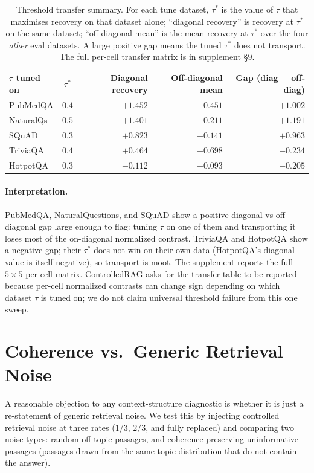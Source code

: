 \begin{table}[!htb]
\centering
\caption{Threshold transfer summary. For each tune dataset, $\tau^\ast$
is the value of $\tau$ that maximises recovery on that dataset alone;
``diagonal recovery'' is recovery at $\tau^\ast$ on the same dataset;
``off-diagonal mean'' is the mean recovery at $\tau^\ast$ over the four
\emph{other} eval datasets. A large positive gap means the tuned
$\tau^\ast$ does not transport. The full per-cell transfer matrix is
in supplement \S 9.}
\label{tab:threshold_transfer_main}
\footnotesize
\begin{tabular}{lcrrr}
\toprule
$\tau$ tuned on & $\tau^\ast$ & Diagonal recovery & Off-diagonal mean & Gap (diag $-$ off-diag) \\
\midrule
PubMedQA  & $0.4$ & $+1.452$ & $+0.451$ & $+1.002$ \\
NaturalQs & $0.5$ & $+1.401$ & $+0.211$ & $+1.191$ \\
SQuAD     & $0.3$ & $+0.823$ & $-0.141$ & $+0.963$ \\
TriviaQA  & $0.4$ & $+0.464$ & $+0.698$ & $-0.234$ \\
HotpotQA  & $0.3$ & $-0.112$ & $+0.093$ & $-0.205$ \\
\bottomrule
\end{tabular}
\end{table}

\paragraph{Interpretation.} PubMedQA, NaturalQuestions, and SQuAD show
a positive diagonal-vs-off-diagonal gap large enough to flag: tuning
$\tau$ on one of them and transporting it loses most of the
on-diagonal normalized contrast. TriviaQA and HotpotQA show a negative
gap; their $\tau^\ast$ does not win on their own data (HotpotQA's
diagonal value is itself negative), so transport is moot. The
supplement reports the full $5 \times 5$ per-cell matrix. ControlledRAG
asks for the transfer table to be reported because per-cell normalized
contrasts can change sign depending on which dataset $\tau$ is tuned
on; we do not claim universal threshold failure from this one sweep.

\section{Coherence vs.\ Generic Retrieval Noise}
\label{sec:noise}

A reasonable objection to any context-structure diagnostic is whether it
is just a re-statement of generic retrieval noise. We test this by
injecting controlled retrieval noise at three rates ($1/3$, $2/3$, and
fully replaced) and comparing two noise types: random off-topic
passages, and coherence-preserving uninformative passages (passages
drawn from the same topic distribution that do not contain the answer).

